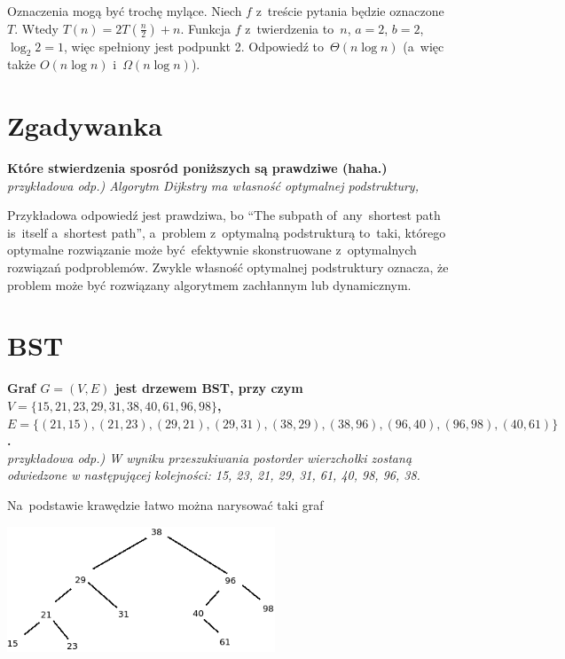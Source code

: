 Oznaczenia mogą być trochę mylące. Niech $f$ z~treście pytania będzie oznaczone $T$. Wtedy $T(n) = 2T(\frac{n}{2}) + n$. Funkcja $f$ z~twierdzenia to~$n$, $a = 2$, $b = 2$, $\log_2 2 = 1 $, więc spełniony jest podpunkt 2. Odpowiedź to~\textbf{$\Theta(n\log n)$} (a~więc także $O(n\log n)$ i~$\Omega (n\log n)$).
 
 
\section{Zgadywanka}
\textbf{Które stwierdzenia sposród poniższych są prawdziwe (haha.)}\\
\textit{przykładowa odp.) Algorytm Dijkstry ma własność optymalnej podstruktury,}

\vspace{0.4cm}

Przykładowa odpowiedź jest prawdziwa, bo ``The subpath of~any~shortest path is~itself a~shortest path'', a~problem z~optymalną podstrukturą to~taki, którego optymalne rozwiązanie może być~efektywnie skonstruowane z~optymalnych rozwiązań podproblemów. Zwykle własność optymalnej podstruktury oznacza, że problem może być rozwiązany algorytmem zachłannym lub dynamicznym.

\section{BST}
\textbf{Graf $G = (V, E)$ jest drzewem BST, przy czym $V = \{15, 21, 23, 29, 31, 38, 40, 61, 96, 98\}$, $E = \{(21, 15),(21, 23),(29, 21),(29, 31),(38, 29),(38, 96),(96, 40),(96, 98),(40, 61)\}$.}\\
\textit{przykładowa odp.) W wyniku przeszukiwania postorder wierzchołki zostaną odwiedzone w następującej kolejności: 15, 23, 21, 29, 31, 61, 40, 98, 96, 38.}

\vspace{0.4cm}

Na~podstawie krawędzie łatwo można narysować taki graf

\begin{center}
 \includegraphics[width=8cm]{bst}
\end{center}

